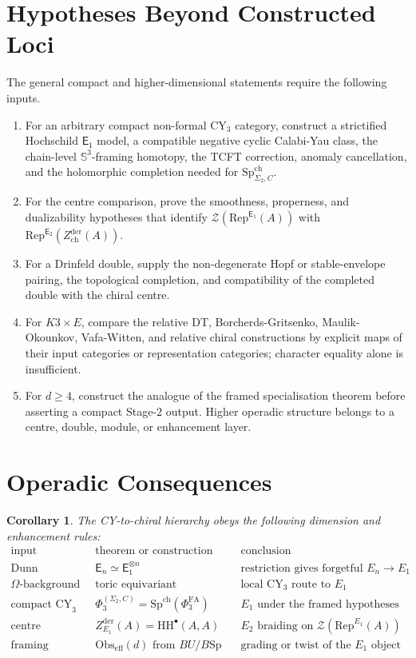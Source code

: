 \documentclass[11pt]{amsart}
\newtheorem{corollary}[theorem]{Corollary}
\theoremstyle{definition}
\theoremstyle{remark}
\newcommand{\En}{\mathsf{E}_n}
\newcommand{\Eone}{\mathsf{E}_1}
\newcommand{\Etwo}{\mathsf{E}_2}
\newcommand{\Rep}{\mathrm{Rep}}
\newcommand{\HH}{\mathrm{HH}}
\providecommand{\PhiFA}{\Phi^{\mathrm{FA}}}
\providecommand{\SpCh}{\mathrm{Sp}^{\mathrm{ch}}}
\providecommand{\Obs}{\mathrm{Obs}}
\newcommand{\cZ}{\mathcal{Z}}
\begin{document}
\section{Hypotheses Beyond Constructed Loci}

The general compact and higher-dimensional statements require the
following inputs.
\begin{enumerate}[label=\textup{(\arabic*)}]
\item For an arbitrary compact non-formal CY$_3$ category, construct a
strictified Hochschild $\Eone$ model, a compatible negative cyclic
Calabi-Yau class, the chain-level $\mathbb{S}^3$-framing homotopy, the
TCFT correction, anomaly cancellation, and the holomorphic completion
needed for $\SpCh_{\Sigma_2,C}$.
\item For the centre comparison, prove the smoothness, properness, and
dualizability hypotheses that identify
$\cZ(\Rep^{\Eone}(A))$ with
$\Rep^{\Etwo}(Z^{\mathrm{der}}_{\mathrm{ch}}(A))$.
\item For a Drinfeld double, supply the non-degenerate Hopf or
stable-envelope pairing, the topological completion, and compatibility
of the completed double with the chiral centre.
\item For $K3\times E$, compare the relative DT, Borcherds-Gritsenko,
Maulik-Okounkov, Vafa-Witten, and relative chiral constructions by
explicit maps of their input categories or representation categories;
character equality alone is insufficient.
\item For $d\geq4$, construct the analogue of the framed
specialisation theorem before asserting a compact Stage-$2$ output.
Higher operadic structure belongs to a centre, double, module, or
enhancement layer.
\end{enumerate}

\section{Operadic Consequences}

\begin{corollary}
The CY-to-chiral hierarchy obeys the following dimension and enhancement
rules:
\[
\begin{array}{lll}
\text{input} & \text{theorem or construction} & \text{conclusion}\\
\hline
\text{Dunn additivity}
& \En\simeq\Eone^{\otimes n}
& \text{restriction gives forgetful } E_n\to E_1\\
\Omega\text{-background}
& \text{toric equivariant localisation}
& \text{local CY}_3\text{ route to }E_1\\
\text{compact CY}_3
& \Phi_3^{(\Sigma_2,C)}=\SpCh(\PhiFA_3)
& E_1\text{ under the framed hypotheses}\\
\text{centre}
& Z^{\mathrm{der}}_{E_1}(A)=\HH^\bullet(A,A)
& E_2\text{ braiding on }\cZ(\Rep^{E_1}(A))\\
\text{framing}
& \Obs_{\mathrm{eff}}(d)\text{ from }BU/B\mathrm{Sp}
& \text{grading or twist of the }E_1\text{ object}
\end{array}
\]
\end{corollary}
\end{document}

